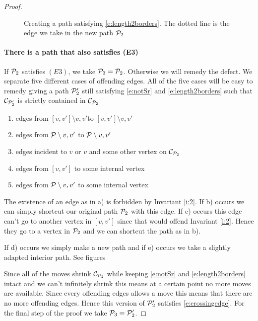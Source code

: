 \documentclass[a4paper]{article}
\theoremstyle{definition}
\newcommand{\scr}[1]{\mathcal{#1}}
\newcommand{\C}{\scr C}
\begin{document}
\begin{proof}
\begin{figure}
    \caption{Creating a path satisfying \ref{e:length2borders}. The dotted line is the edge we take in the new path $\P_2$}\label{fig:E2}
\end{figure}

\newcommand{\intvv}{\ensuremath{[v,v']\setminus{v,v'}}}
\newcommand{\intP}{\ensuremath{\P\setminus{v,v'}}}

\paragraph{There is a path that also satisfies (E3)}
If $\P_2$ satisfies $(E3)$, we take $\P_3 = \P_2$. Otherwise we will remedy the defect. We separate five different cases of offending edges. All of the five cases will be easy to remedy giving a path $\P'_2$ still satisfying \ref{e:notSr} and \ref{e:length2borders} such that $\C_{\P'_2}$ is strictly contained in $\C_{\P_2}$ %
\begin{enumerate}
 \renewcommand*{\labelenumi}{\alph{enumi})}%
 \renewcommand*{\theenumi}{\alph{enumi})}%
 \item edges from \intvv to $\intvv$
 \item edges from $\intP$ to $\intP$
 \item edges incident to $v$ or $v$ and some other vertex on $\C_{\P_2}$
 \item edges from $[v,v']$ to some internal vertex 
 \item edges from $\intP$ to some internal vertex
\end{enumerate}

The existence of an edge as in a) is forbidden by Invariant \ref{i:2}. If b) occurs we can simply shortcut our original path $\P_2$ with this edge. If c) occurs this edge can't go to another vertex in $[v,v']$ since that would offend Invariant \ref{i:2}. Hence they go to a vertex in $\P_2$ and we can shortcut the path as in b).

If d) occurs we simply make a new path and if e) occurs we take a slightly adapted interior path. See figures


Since all of the moves shrink $\C_{\P_2}$ while keeping \ref{e:notSr} and \ref{e:length2borders} intact and we can't infinitely shrink this means at a certain point no more moves are available. Since every offending edges allows a move this means that there are no more offending edges. Hence this version of $\P'_2$ satisfies \ref{e:crossingedge}. For the final step of the proof we take $\P_3 = \P'_2$.


\end{proof}
\end{document}
